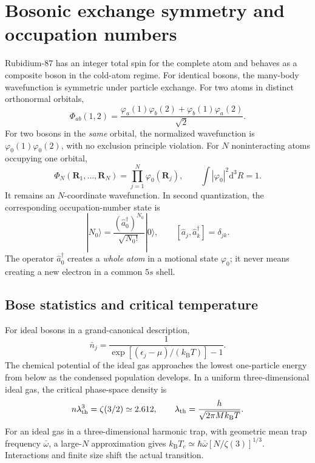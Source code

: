 \documentclass[11pt,a4paper]{article}
\newcommand{\kb}{k_{\mathrm B}}
\newcommand{\ph}{\varphi}
\newcommand{\dd}{\mathrm d}
\begin{document}
\section{Bosonic exchange symmetry and occupation numbers}
Rubidium-87 has an integer total spin for the complete atom and behaves as a composite boson in the cold-atom regime. For identical bosons, the many-body wavefunction is symmetric under particle exchange. For two atoms in distinct orthonormal orbitals,
\begin{equation}
\Phi_{ab}(1,2)=\frac{\ph_a(1)\ph_b(2)+\ph_b(1)\ph_a(2)}{\sqrt2}.
\end{equation}
For two bosons in the \emph{same} orbital, the normalized wavefunction is $\ph_0(1)\ph_0(2)$, with no exclusion principle violation. For $N$ noninteracting atoms occupying one orbital,
\begin{equation}
\Phi_N(\mathbf R_1,\ldots,\mathbf R_N)=\prod_{j=1}^{N}\ph_0(\mathbf R_j),\qquad \int |\ph_0|^2\dd^3R=1.
\end{equation}
It remains an $N$-coordinate wavefunction. In second quantization, the corresponding occupation-number state is
\begin{equation}
|N_0\rangle=\frac{(\hat a_0^\dagger)^{N_0}}{\sqrt{N_0!}}|0\rangle,\qquad [\hat a_j,\hat a_k^\dagger]=\delta_{jk}.
\end{equation}
The operator $\hat a_0^\dagger$ creates a \emph{whole atom} in a motional state $\ph_0$; it never means creating a new electron in a common $5s$ shell.

\subsection{Bose statistics and critical temperature}
For ideal bosons in a grand-canonical description,
\begin{equation}
\bar n_j=\frac{1}{\exp[(\epsilon_j-\mu)/(\kb T)]-1}.
\end{equation}
The chemical potential of the ideal gas approaches the lowest one-particle energy from below as the condensed population develops. In a uniform three-dimensional ideal gas, the critical phase-space density is
\begin{equation}
n\lambda_{\rm th}^3=\zeta(3/2)\simeq2.612,\qquad
\lambda_{\rm th}=\frac{h}{\sqrt{2\pi M\kb T}}.
\end{equation}
For an ideal gas in a three-dimensional harmonic trap, with geometric mean trap frequency $\bar\omega$, a large-$N$ approximation gives $\kb T_c\simeq\hbar\bar\omega[N/\zeta(3)]^{1/3}$. Interactions and finite size shift the actual transition.
\end{document}

